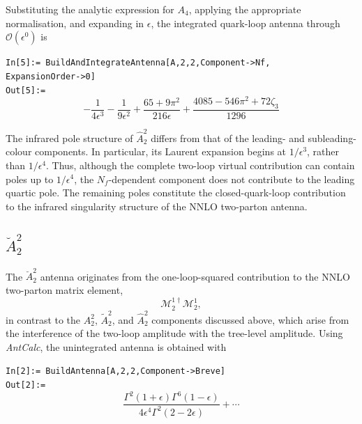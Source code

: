Substituting the analytic expression for $A_4$, applying the appropriate normalisation, and expanding
in $\epsilon$, the integrated quark-loop antenna through $\mathcal O(\epsilon^0)$ is

\begin{mdframed}[backgroundcolor=gray!10, linewidth=0pt]
\texttt{In[5]:= BuildAndIntegrateAntenna[A,2,2,Component->Nf,\\ExpansionOrder->0]}\\
\hfill
\texttt{Out[5]:=}
    \begin{equation*}
        -\frac1{4\epsilon^3}-\frac1{9\epsilon^2}+\frac{65+9\pi^2}{216\epsilon}+\frac{4085-546\pi^2+72\zeta_3}{1296}
    \end{equation*}
\end{mdframed}

The infrared pole structure of $\hat A_2^2$ differs from that of the leading- and subleading-colour
components. In particular, its Laurent expansion begins at $1/\epsilon^3$, rather than $1/\epsilon^4$.
Thus, although the complete two-loop virtual contribution can contain poles up to $1/\epsilon^4$, the
$N_f$-dependent component does not contribute to the leading quartic pole. The remaining poles
constitute the closed-quark-loop contribution to the infrared singularity structure of the NNLO
two-parton antenna.

\subsection{$\breve A_2^2$}

The $\breve A_2^2$ antenna originates from the one-loop-squared contribution to the NNLO two-parton
matrix element,
\begin{equation*}
    \mathcal M_2^{1\dagger}\mathcal M_2^1,
\end{equation*}
in contrast to the $A_2^2$, $\tilde A_2^2$, and $\hat A_2^2$ components discussed above, which arise
from the interference of the two-loop amplitude with the tree-level amplitude.
Using \textit{AntCalc}, the unintegrated antenna is obtained with

\begin{mdframed}[backgroundcolor=gray!10, linewidth=0pt]
\texttt{In[2]:= BuildAntenna[A,2,2,Component->Breve]}\\
\hfill
\texttt{Out[2]:=}
    \begin{equation*}
        \frac{\Gamma^2(1+\epsilon)\Gamma^6(1-\epsilon)}{4\epsilon^4\Gamma^2(2-2\epsilon)}+\cdots
    \end{equation*}
\end{mdframed}

